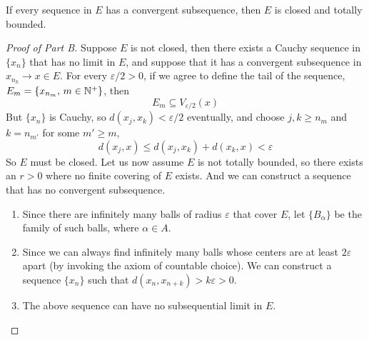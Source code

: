 \documentclass[../../main.tex]{subfiles}
\begin{document}
\begin{wts}
    If every sequence in $E$ has a convergent subsequence, then $E$ is closed and totally bounded.
\end{wts}
\begin{proof}[Proof of Part B]
    Suppose $E$ is not closed, then there exists a Cauchy sequence in $\{x_n\}$ that has no limit in $E$, and suppose that it has a convergent subsequence in $x_{n_k}\to x\in E$. For every $\varepsilon/2>0$, if we agree to define the tail of the sequence, $E_m = \{x_{n_m},\, m\in \mathbb{N}^+\}$, then 
    \[
    E_m\subseteq V_{\varepsilon/2}(x)
    \]
    But $\{x_n\}$ is Cauchy, so $d(x_j,x_k)<\varepsilon/2$ eventually, and choose $j,k\geq n_m$ and $k=n_{m'}$ for some $m'\geq m$,
    \[
    d(x_j, x)\leq d(x_j,x_k) +d(x_k,x) <\varepsilon
    \]
    So $E$ must be closed. Let us now assume $E$ is not totally bounded, so there exists an $r>0$ where no finite covering of $E$ exists. And we can construct a sequence that has no convergent subsequence.
    \begin{enumerate}
        \item Since there are infinitely many balls of radius $\varepsilon$ that cover $E$, let $\{B_\alpha\}$ be the family of such balls, where $\alpha\in A$.
        \item Since we can always find infinitely many balls whose centers are at least $2\varepsilon$ apart (by invoking the axiom of countable choice). We can construct a sequence $\{x_n\}$ such that $d(x_n,x_{n+k})>k\varepsilon>0$.
        \item The above sequence can have no subsequential limit in $E$.
    \end{enumerate}
\end{proof}
\end{document}

